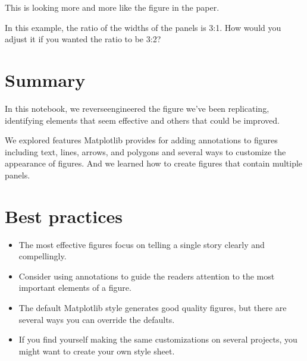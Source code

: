 \documentclass[letterpaper,10pt,english]{sphinxmanual}
\begin{document}
\noindent{}

This is looking more and more like the figure in the paper.

 In this example, the ratio of the widths of the panels is 3:1.  How would you adjust it if you wanted the ratio to be 3:2?


\section{Summary}
\label{\detokenize{07_plot:summary}}
In this notebook, we reverse\sphinxhyphen{}engineered the figure we’ve been replicating, identifying elements that seem effective and others that could be improved.

We explored features Matplotlib provides for adding annotations to figures \textendash{} including text, lines, arrows, and polygons \textendash{} and several ways to customize the appearance of figures.  And we learned how to create figures that contain multiple panels.


\section{Best practices}
\label{\detokenize{07_plot:best-practices}}\begin{itemize}
\item {} 
The most effective figures focus on telling a single story clearly and compellingly.

\item {} 
Consider using annotations to guide the readers attention to the most important elements of a figure.

\item {} 
The default Matplotlib style generates good quality figures, but there are several ways you can override the defaults.

\item {} 
If you find yourself making the same customizations on several projects, you might want to create your own style sheet.

\end{itemize}







\renewcommand{\indexname}{Index}
\printindex
\end{document}
